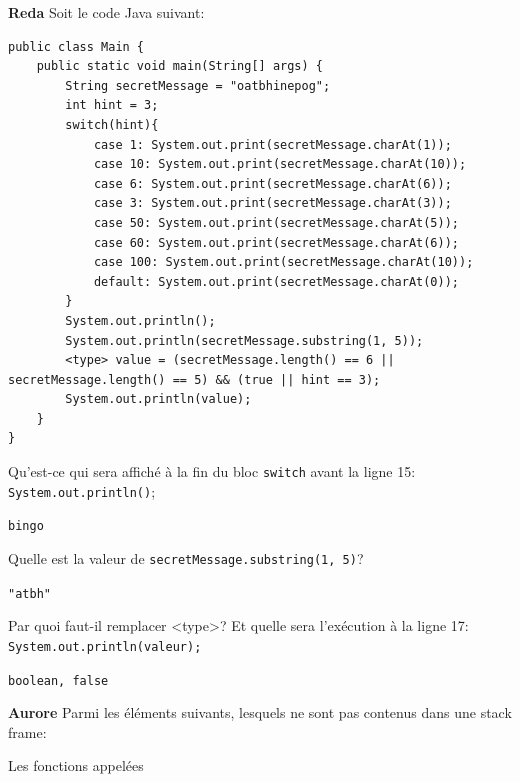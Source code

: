 \begin{Exercice}[5 minutes]\textbf{Reda}
Soit le code Java suivant:
\begin{lstlisting}[style=javastyle]
public class Main {
    public static void main(String[] args) {
        String secretMessage = "oatbhinepog";
        int hint = 3;
        switch(hint){
            case 1: System.out.print(secretMessage.charAt(1));
            case 10: System.out.print(secretMessage.charAt(10));
            case 6: System.out.print(secretMessage.charAt(6));
            case 3: System.out.print(secretMessage.charAt(3));
            case 50: System.out.print(secretMessage.charAt(5));
            case 60: System.out.print(secretMessage.charAt(6));
            case 100: System.out.print(secretMessage.charAt(10));
            default: System.out.print(secretMessage.charAt(0));
        }
        System.out.println();
        System.out.println(secretMessage.substring(1, 5));
        <type> value = (secretMessage.length() == 6 || secretMessage.length() == 5) && (true || hint == 3);
        System.out.println(value);
    }
}
\end{lstlisting}
Qu'est-ce qui sera affiché à la fin du bloc \texttt{switch} avant la ligne 15: \texttt{System.out.println()};

\begin{solution}
\texttt{bingo}
\end{solution}

Quelle est la valeur de \texttt{secretMessage.substring(1, 5)}?
\begin{solution}
\texttt{"atbh"}
\end{solution}


Par quoi faut-il remplacer <type>? Et quelle sera l'exécution à la ligne 17: \texttt{System.out.println(valeur);} 

\begin{solution}
\texttt{boolean, false}
\end{solution}

\end{Exercice}

\begin{Exercice}[5 minutes]\textbf{Aurore}
Parmi les éléments suivants, lesquels ne sont pas contenus dans une stack frame:

\begin{solution}
Les fonctions appelées
\end{solution}
\end{Exercice}


